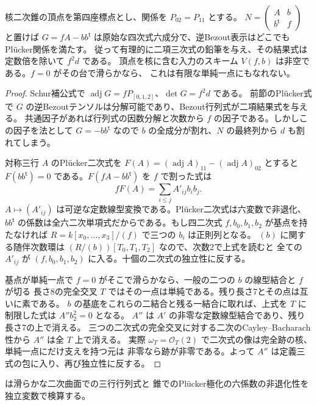 \begin{proposition}\label{prop:nine-cone-transfer}
核二次錐の頂点を第四座標点とし、関係を $P_{02}=P_{11}$ とする。
$N=\left(\begin{smallmatrix}A&b\\b^{\mathsf t}&f\end{smallmatrix}\right)$ と置けば
$G=fA-bb^{\mathsf t}$ は原始な四次式六成分で、逆Bezout表示はどこでもPlücker関係を満たす。
従って有理的に二項三次式の鉛筆を与え、その結果式は定数倍を除いて $f^2d$ である。
頂点を核に含む入力のスキーム $V(f,b)$ は非空である。$f=0$ がその台で滑らかなら、
これは有限な単純一点にもなれない。
\end{proposition}
\begin{proof}
Schur補公式で $\operatorname{adj}G=f P_{[0,1,2]}$、$\det G=f^2d$ である。
前節のPlücker式で $G$ の逆Bezoutテンソルは分解可能であり、Bezout行列式が二項結果式を与える。
共通因子があれば行列式の因数分解と次数から $f$ の因子である。しかしこの因子を法として
$G=-bb^{\mathsf t}$ なので $b$ の全成分が割れ、$N$ の最終列から $d$ も割れてしまう。

対称三行 $A$ のPlücker二次式を $F(A)=(\operatorname{adj}A)_{11}-(\operatorname{adj}A)_{02}$ とすると
$F(bb^{\mathsf t})=0$ である。$F(fA-bb^{\mathsf t})$ を $f$ で割った式は
\[
                 f F(A)=\sum_{i\le j} A'_{ij} b_i b_j .
\]
$A\mapsto(A'_{ij})$ は可逆な定数線型変換である。Plücker二次式は六変数で非退化、
$b b^{\mathsf t}$ の係数は全六二次単項式だからである。もし四二次式 $f,b_0,b_1,b_2$ が基点を持たなければ
$R=k[x_0,\ldots,x_3]/(f)$ で三つの $b_i$ は正則列となる。
$(b)$ に関する随伴次数環は $(R/(b))[T_0,T_1,T_2]$ なので、次数2で上式を読むと
全ての $A'_{ij}$ が $(f,b_0,b_1,b_2)$ に入る。十個の二次式の独立性に反する。

基点が単純一点で $f=0$ がそこで滑らかなら、一般の二つの $b$ の線型結合と $f$ が切る
長さ8の完全交叉 $T$ ではその一点は単純である。残り長さ7とその点は互いに素である。
$b$ の基底をこれらの二結合と残る一結合に取れば、上式を $T$ に制限した式は $A'' b_2^2=0$ となる。
$A''$ は $A'$ の非零な定数線型結合であり、残り長さ7の上で消える。
三つの二次式の完全交叉に対する二次のCayley--Bacharach性から $A''$ は全 $T$ 上で消える。
実際 $\omega_T=\mathcal O_T(2)$ で二次式の像は完全跡の核、単純一点にだけ支えを持つ元は
非零なら跡が非零である。よって $A''$ は定義三式の包に入り、再び独立性に反する。
\end{proof}

 は滑らかな二次曲面での三行行列式と
錐でのPlücker極化の六係数の非退化性を独立変数で検算する。
